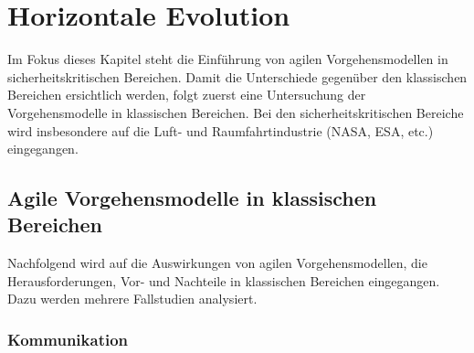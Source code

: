 \chapter{Horizontale Evolution} \label{sec:horizontal} %

Im Fokus dieses Kapitel steht die Einführung von agilen Vorgehensmodellen in sicherheitskritischen Bereichen.
Damit die Unterschiede gegenüber den klassischen Bereichen ersichtlich werden, folgt zuerst eine Untersuchung der Vorgehensmodelle in klassischen Bereichen.
Bei den sicherheitskritischen Bereiche wird insbesondere auf die Luft- und Raumfahrtindustrie (NASA, ESA, etc.) eingegangen.

\section{Agile Vorgehensmodelle in klassischen Bereichen} %

Nachfolgend wird auf die Auswirkungen von agilen Vorgehensmodellen, die Herausforderungen, Vor- und Nachteile in klassischen Bereichen eingegangen.
Dazu werden mehrere Fallstudien analysiert.

\subsection{Kommunikation} %

